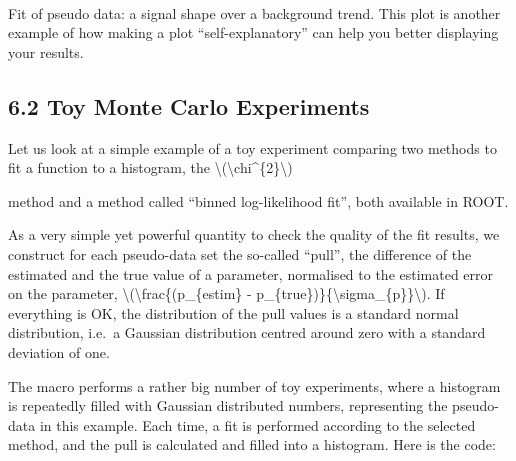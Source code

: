 \documentclass{article}
\begin{document}
    \begin{center}
    \end{center}
    { \hspace*{\fill} \\}
    
    Fit of pseudo data: a signal shape over a background trend. This plot is
another example of how making a plot ``self-explanatory'' can help you
better displaying your results.

\subsection{6.2 Toy Monte Carlo
Experiments}\label{toy-monte-carlo-experiments}

Let us look at a simple example of a toy experiment comparing two
methods to fit a function to a histogram, the
\textbackslash{}(\textbackslash{}chi\^{}\{2\}\textbackslash{})

method and a method called ``binned log-likelihood fit'', both available
in ROOT.

As a very simple yet powerful quantity to check the quality of the fit
results, we construct for each pseudo-data set the so-called ``pull'',
the difference of the estimated and the true value of a parameter,
normalised to the estimated error on the parameter,
\textbackslash{}(\textbackslash{}frac\{(p\_\{estim\} -
p\_\{true\})\}\{\textbackslash{}sigma\_\{p\}\}\textbackslash{}). If
everything is OK, the distribution of the pull values is a standard
normal distribution, i.e.~a Gaussian distribution centred around zero
with a standard deviation of one.

The macro performs a rather big number of toy experiments, where a
histogram is repeatedly filled with Gaussian distributed numbers,
representing the pseudo-data in this example. Each time, a fit is
performed according to the selected method, and the pull is calculated
and filled into a histogram. Here is the code:
\end{document}
